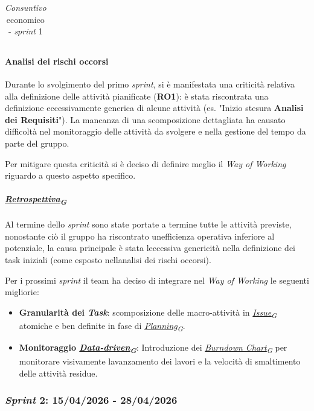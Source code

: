\documentclass[12pt, a4paper]{article}
\newcommand{\urlglossario}{https://skynetunigroup.github.io/Code_Guardian/Documentazione/PB/glossario_v2.0.0.pdf} %
\newcommand{\glo}[2]{\href{\urlglossario\#nameddest=#2}{#1\textsubscript{G}}}
\begin{document}
{\begin{table}[H]
{\begin{tabularx}{1.09\textwidth}{|X|c|c|c|c|c|c|c|}
        \end{tabularx}
        }
    \caption{\textit{Consuntivo} economico - \textit{sprint} 1}
\end{table}

\paragraph{Analisi dei rischi occorsi}

Durante lo svolgimento del primo \textit{sprint}, si è manifestata una
criticità relativa alla definizione delle attività pianificate
(\textbf{RO1}): è stata riscontrata una definizione eccessivamente
generica di alcune attività (es.
"Inizio stesura \textbf{Analisi dei Requisiti}"). La mancanza di una scomposizione dettagliata ha causato
difficoltà nel monitoraggio delle attività da svolgere e nella gestione
del tempo da parte del gruppo.

Per mitigare questa criticità si è deciso di definire meglio il
\textit{Way of Working} riguardo a questo aspetto specifico.
\paragraph{\textit{\glo{Retrospettiva}{retrospettiva}}}

Al termine dello \textit{sprint} sono state portate a termine tutte le
attività previste, nonostante ciò il gruppo ha riscontrato
un\textquotesingle efficienza operativa inferiore al potenziale, la
causa principale è stata l\textquotesingle eccessiva genericità nella
definizione dei task iniziali (come esposto nell\textquotesingle analisi
dei rischi occorsi).

Per i prossimi \textit{sprint} il team ha deciso di integrare nel \textit{Way of Working} le seguenti migliorie:

\begin{itemize}
\item
  \textbf{Granularità dei \textit{Task}}: scomposizione delle
  macro-attività in \textit{\glo{Issue}{issue}} atomiche e ben definite in fase di
  \textit{\glo{Planning}{planning}}.
\item
  \textbf{Monitoraggio \textit{\glo{Data-driven}{data-driven}}}: Introduzione dei
  \textit{\glo{Burndown Chart}{burndown-chart}} per monitorare visivamente
  l\textquotesingle avanzamento dei lavori e la velocità di smaltimento
  delle attività residue.
\end{itemize}

\subsubsection{\textit{Sprint} 2: 15/04/2026 - 28/04/2026}

}
\end{document}
